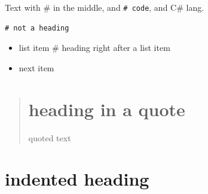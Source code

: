 Text with \# in the middle, and \texttt{# code}, and C\# lang.

\begin{listing}[H]
\begin{verbatim}
# not a heading
\end{verbatim}
\end{listing}

\begin{itemize}
\item list item \# heading right after a list item
\item next item 
\end{itemize}

\begin{quotation}
\chapter*{heading in a quote}

  quoted text
\end{quotation}
\chapter*{indented heading}


